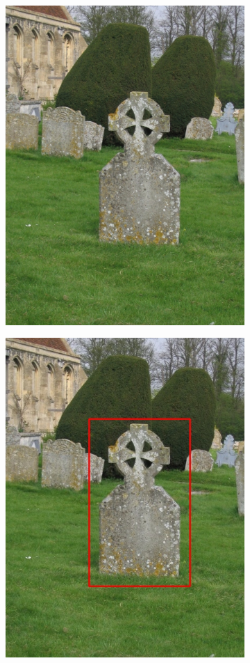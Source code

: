 \documentclass[a4paper,11]{article}
\begin{document}
\begin{center}
\begin{figure}[H]
   \begin{subfigure}{0.33\textwidth}
      \centering
      \includegraphics[width=0.9\linewidth]{images/grave}
    \end{subfigure}
    \begin{subfigure}{.33\textwidth}
      \centering
      \includegraphics[width=0.9\linewidth]{results/input/grave}

\end{subfigure}
\end{figure}
\end{center}
\end{document}
